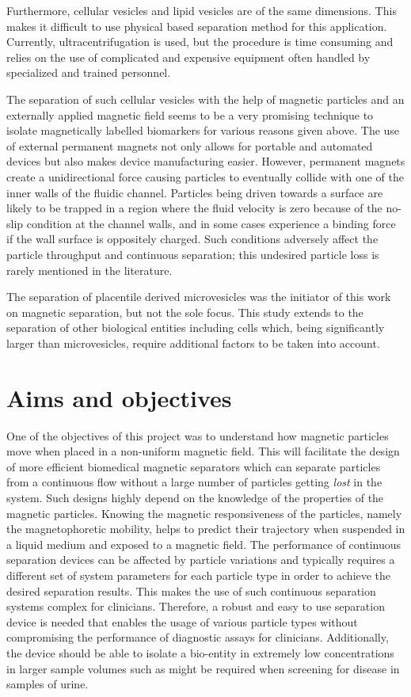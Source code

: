 Furthermore, cellular vesicles and lipid vesicles are of the same dimensions. This makes it difficult to use physical based separation method for this application. Currently, ultracentrifugation is used, but the procedure is time consuming and relies on the use of complicated and expensive equipment often handled by specialized and trained personnel.

The separation of such cellular vesicles with the help of magnetic particles and an externally applied magnetic field seems to be a very promising technique to isolate magnetically labelled biomarkers for various reasons given above. The use of external permanent magnets not only allows for portable and automated devices but also makes device manufacturing easier. However, permanent magnets create a unidirectional force causing particles to eventually collide with one of the inner walls of the fluidic channel. Particles being driven towards a surface are likely to be trapped in a region where the fluid velocity is zero because of the no-slip condition at the channel walls, and in some cases experience a binding force if the wall surface is oppositely charged. Such conditions adversely affect the particle throughput and continuous separation; this undesired particle loss is rarely mentioned in the literature.

The separation of placentile derived microvesicles was the initiator of this work on magnetic separation, but not the sole focus. This study extends to the separation of other biological entities including cells which, being significantly larger than microvesicles, require additional factors to be taken into account.

\section{Aims and objectives}\label{sec:aimsAndObjectives}
One of the objectives of this project was to understand how magnetic particles move when placed in a non-uniform magnetic field. This will facilitate the design of more efficient biomedical magnetic separators which can separate particles from a continuous flow without a large number of particles getting \textit{lost} in the system. Such designs highly depend on the knowledge of the properties of the magnetic particles. Knowing the magnetic responsiveness of the particles, namely the magnetophoretic mobility, helps to predict their trajectory when suspended in a liquid medium and exposed to a magnetic field. The performance of continuous separation devices can be affected by particle variations and typically requires a different set of system parameters for each particle type in order to achieve the desired separation results. This makes the use of such continuous separation systems complex for clinicians. Therefore, a robust and easy to use separation device is needed that enables the usage of various particle types without compromising the performance of diagnostic assays for clinicians. Additionally, the device should be able to isolate a bio-entity in extremely low concentrations in larger sample volumes such as might be required when screening for disease in samples of urine.

